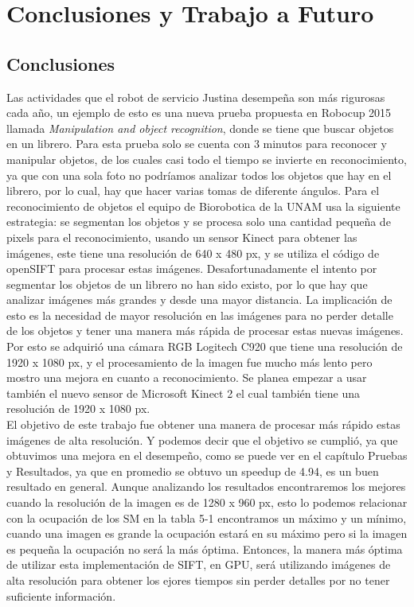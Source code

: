 \chapter{Conclusiones y Trabajo a Futuro}
\section{Conclusiones}
Las actividades que el robot de servicio Justina desempeña son más rigurosas cada año, un ejemplo de esto es una nueva prueba propuesta en Robocup 2015 llamada \textit{Manipulation and object recognition}, donde se tiene que buscar objetos en un librero. Para esta prueba solo se cuenta con 3 minutos para reconocer y manipular objetos,  de los cuales casi todo el tiempo se invierte en reconocimiento, ya que con una sola foto no podríamos analizar todos los objetos que  hay en el librero, por lo cual, hay que hacer varias tomas de diferente ángulos. Para el reconocimiento de objetos el equipo de Biorobotica de la UNAM usa la siguiente estrategia: se segmentan los objetos y se procesa solo una cantidad pequeña de pixels para el reconocimiento, usando un sensor Kinect para obtener las imágenes, este tiene una resolución de  640 x 480 px, y se utiliza el código de openSIFT para procesar estas imágenes. Desafortunadamente el intento por segmentar los objetos de un librero no han sido existo, por lo que hay que analizar imágenes más grandes y desde una mayor distancia. La implicación de esto es la necesidad de mayor resolución en las imágenes para no perder detalle de los objetos y tener una manera más rápida de procesar estas nuevas imágenes. Por esto se adquirió una cámara RGB Logitech C920 que tiene una resolución de 1920 x 1080 px, y el procesamiento de la imagen fue mucho más lento pero mostro una mejora en cuanto a reconocimiento. Se planea empezar a usar también el nuevo sensor de Microsoft Kinect 2 el cual también tiene una resolución de 1920 x 1080 px.\\
El objetivo de este trabajo fue obtener una manera de procesar más rápido estas imágenes de alta resolución. Y podemos decir que el objetivo se cumplió, ya que obtuvimos una mejora en el desempeño, como se puede ver en el capítulo Pruebas y Resultados, ya que en promedio se obtuvo un speedup de 4.94, es un buen resultado en general. Aunque analizando los resultados encontraremos los mejores cuando la resolución de la imagen es de 1280 x 960 px, esto lo podemos relacionar con la ocupación de los SM en la tabla 5-1 encontramos un máximo y un mínimo, cuando una imagen es grande la ocupación estará en su máximo pero si la imagen es pequeña la ocupación no será la más óptima. Entonces, la manera más óptima de utilizar esta implementación de SIFT, en GPU, será utilizando imágenes de alta resolución para obtener los ejores tiempos sin perder detalles por no tener suficiente información.      
